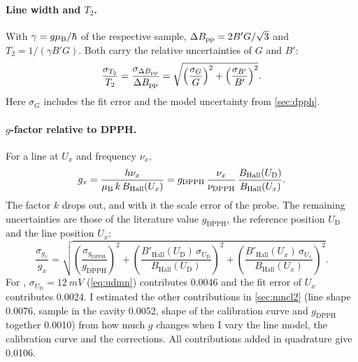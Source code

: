 \paragraph{Line width and \texorpdfstring{$T_2$}{T2}.}
With $\gamma=g\mu_\mathrm{B}/\hbar$ of the respective sample, $\Delta B_\mathrm{pp}=2B'G/\sqrt3$ and $T_2=1/(\gamma B'G)$. Both carry the
relative uncertainties of $G$ and $B'$:
\begin{equation}
  \frac{\sigma_{T_2}}{T_2}=\frac{\sigma_{\Delta B_\mathrm{pp}}}{\Delta B_\mathrm{pp}}=\sqrt{\left(\frac{\sigma_G}{G}\right)^2+\left(\frac{\sigma_{B'}}{B'}\right)^2}.
\end{equation}
Here $\sigma_G$ includes the fit error and the model uncertainty from \cref{sec:dpph}.

\paragraph{\texorpdfstring{$g$}{g}-factor relative to DPPH.}
For a line at $U_x$ and frequency $\nu_x$,
\begin{equation}\label{eq:grel}
  g_x=\frac{h\nu_x}{\mu_\mathrm{B}\,k\,B_\text{Hall}(U_x)}
  =g_\text{DPPH}\,\frac{\nu_x}{\nu_\text{DPPH}}\,\frac{B_\text{Hall}(U_\text{D})}{B_\text{Hall}(U_x)} .
\end{equation}
The factor $k$ drops out, and with it the scale error of the probe. The remaining uncertainties are those of the
literature value $g_\text{DPPH}$, the reference position $U_\text{D}$ and the line position $U_x$:
\begin{equation}
  \frac{\sigma_{g_x}}{g_x}=\sqrt{\left(\frac{\sigma_{g_\text{DPPH}}}{g_\text{DPPH}}\right)^2
  +\left(\frac{B'_\text{Hall}(U_\text{D})\,\sigma_{U_\text{D}}}{B_\text{Hall}(U_\text{D})}\right)^2
  +\left(\frac{B'_\text{Hall}(U_x)\,\sigma_{U_x}}{B_\text{Hall}(U_x)}\right)^2}.
\end{equation}
For , $\sigma_{U_\text{D}}=\qty{12}{mV}$ (\cref{eq:udmn}) contributes \num{0.0046} and the fit error of $U_x$
contributes \num{0.0024}. I estimated the other contributions in \cref{sec:mncl2} (line shape \num{0.0076}, sample in
the cavity \num{0.0052}, shape of the calibration curve and $g_\text{DPPH}$ together \num{0.0010}) from how much $g$
changes when I vary the line model, the calibration curve and the corrections. All contributions added in quadrature
give \num{0.0106}.

